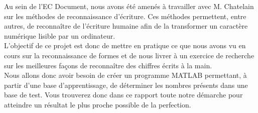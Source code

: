 Au sein de l'EC Document, nous avons été amenés à travailler
avec M. Chatelain sur les méthodes de reconnaissance d'écriture.
Ces méthodes permettent, entre autres, de reconnaître de 
l'écriture humaine afin de la transformer un caractère numérique
lisible par un ordinateur. \\
L'objectif de ce projet est donc de mettre en pratique ce que
nous avons vu en cours sur la reconnaissance de formes et de nous
livrer à un exercice de recherche sur les meilleures façons de 
reconnaître des chiffres écrits à la main. \\
Nous allons donc avoir besoin de créer un programme MATLAB
permettant, à partir d'une base d'apprentissage, de déterminer les
nombres présents dans une base de test. Vous trouverez donc dans
ce rapport toute notre démarche pour atteindre un résultat le plus
proche possible de la perfection. 